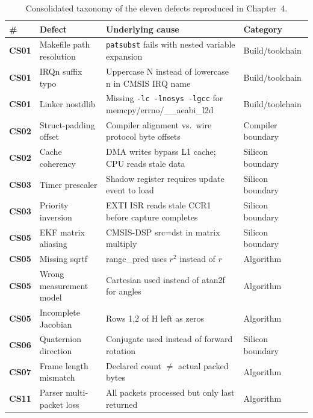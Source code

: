 \begin{table}[htbp]
\centering
\caption{Consolidated taxonomy of the eleven defects reproduced in Chapter~4.}
\label{tab:5.1}
\small
\begin{tabularx}{\textwidth}{@{}p{0.5cm}p{2.8cm}Yp{2.8cm}@{}}
\toprule
\textbf{\#} & \textbf{Defect} & \textbf{Underlying cause} & \textbf{Category} \\
\midrule
\textbf{CS01} & Makefile path resolution & \texttt{patsubst} fails with nested variable expansion & Build/toolchain \\
\textbf{CS01} & IRQn suffix typo & Uppercase N instead of lowercase n in CMSIS IRQ name & Build/toolchain \\
\textbf{CS01} & Linker nostdlib & Missing \texttt{-lc -lnosys -lgcc} for memcpy/errno/\_\_aeabi\_l2d & Build/toolchain \\
\midrule
\textbf{CS02} & Struct-padding offset & Compiler alignment vs.\ wire protocol byte offsets & Compiler boundary \\
\midrule
\textbf{CS02} & Cache coherency & DMA writes bypass L1 cache; CPU reads stale data & Silicon boundary \\
\textbf{CS03} & Timer prescaler & Shadow register requires update event to load & Silicon boundary \\
\textbf{CS03} & Priority inversion & EXTI ISR reads stale CCR1 before capture completes & Silicon boundary \\
\textbf{CS05} & EKF matrix aliasing & CMSIS-DSP src=dst in matrix multiply & Silicon boundary \\
\textbf{CS05} & Missing sqrtf & range\_pred uses $r^2$ instead of $r$ & Algorithm \\
\textbf{CS05} & Wrong measurement model & Cartesian used instead of atan2f for angles & Algorithm \\
\textbf{CS05} & Incomplete Jacobian & Rows 1,2 of H left as zeros & Algorithm \\
\textbf{CS06} & Quaternion direction & Conjugate used instead of forward rotation & Silicon boundary \\
\textbf{CS07} & Frame length mismatch & Declared count $\neq$ actual packed bytes & Algorithm \\
\textbf{CS11} & Parser multi-packet loss & All packets processed but only last returned & Algorithm \\
\bottomrule
\end{tabularx}
\end{table}

